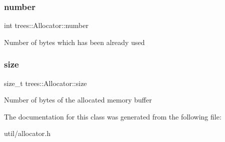 \subsubsection{\texorpdfstring{number}{number}}
{\footnotesize\ttfamily int trees\+::\+Allocator\+::number}

Number of bytes which has been already used \mbox{\label{classtrees_1_1_allocator_a4e5438309246d70ff0c6d9a9f02883cc}} 
\subsubsection{\texorpdfstring{size}{size}}
{\footnotesize\ttfamily size\+\_\+t trees\+::\+Allocator\+::size}

Number of bytes of the allocated memory buffer 

The documentation for this class was generated from the following file\+:\begin{DoxyCompactItemize}
\item 
util/allocator.\+h\end{DoxyCompactItemize}
